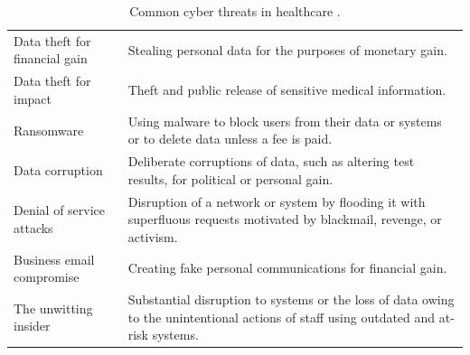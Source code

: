 \documentclass{IEEEtran}
\begin{document}
\begin{table}[tbh]
	\caption{Common cyber threats in healthcare \cite{martin2017cybersecurity}.}
	\centering
	\begin{tabular}{l l}
		\hline\hline
	Data theft for financial gain & Stealing personal data for the purposes of monetary gain. \\
	Data theft for impact & Theft and public release of sensitive medical information. \\
	Ransomware & Using malware to block users from their data or systems or to delete data unless a fee is paid. \\
	Data corruption & Deliberate corruptions of data, such as altering test results, for political or personal gain. \\
	Denial of service attacks & Disruption of a network or system by flooding it with superfluous requests motivated by blackmail, revenge, or activism. \\
	Business email compromise & Creating fake personal communications for financial gain.\\ 
	The unwitting insider & Substantial disruption to systems or the loss of data owing to the unintentional actions of staff using outdated and at-risk systems. \\
	\hline
	\end{tabular}
	\label{tab:common}
\end{table}
\end{document}
